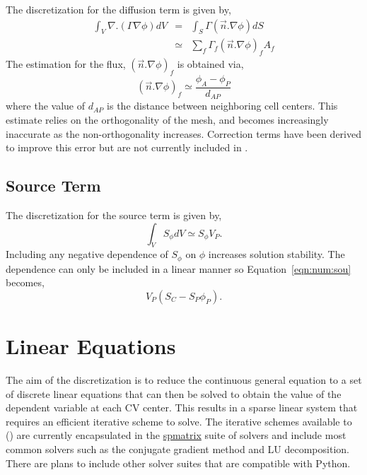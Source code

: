 The discretization for the diffusion term is given by,
\begin{eqnarray}
\int_V \nabla.(\Gamma\nabla\phi) dV & = & \int_S \Gamma (\vec{n}.\nabla\phi) dS \\
& \simeq & \sum_f \Gamma_f (\vec{n}.\nabla\phi)_f A_f
\label{eqn:num:dif}
\end{eqnarray}
The estimation for the flux, $(\vec{n}.\nabla\phi)_f$ is obtained via,
\begin{equation}
(\vec{n}.\nabla\phi)_f \simeq \frac{\phi_A-\phi_P}{d_{AP}}
\end{equation}
where the value of $d_{AP}$ is the distance between neighboring cell
centers.  This estimate relies on the orthogonality of the mesh, and
becomes increasingly inaccurate as the non-orthogonality increases.
Correction terms have been derived to improve this error but are not
currently included in \FiPy{}.

\subsection{Source Term}

The discretization for the source term is given by, 
\begin{equation}
\int_V S_{\phi} dV \simeq S_\phi V_P.
\label{eqn:num:sou}
\end{equation}
Including any negative dependence of $S_\phi$ on $\phi$ increases
solution stability. The dependence can only be included in a linear
manner so Equation~\eqref{eqn:num:sou} becomes,
\begin{equation}
V_P (S_C - S_P \phi_P).
\end{equation}

\section{Linear Equations}

The aim of the discretization is to reduce the continuous general
equation to a set of discrete linear equations that can then be solved
to obtain the value of the dependent variable at each CV center. This
results in a sparse linear system that requires an efficient iterative
scheme to solve. The iterative schemes available to \FiPy() are
currently encapsulated in the \href{#id5}{spmatrix} suite of solvers
and include most common solvers such as the conjugate gradient method
and LU decomposition. There are plans to include other solver suites
that are compatible with Python.

